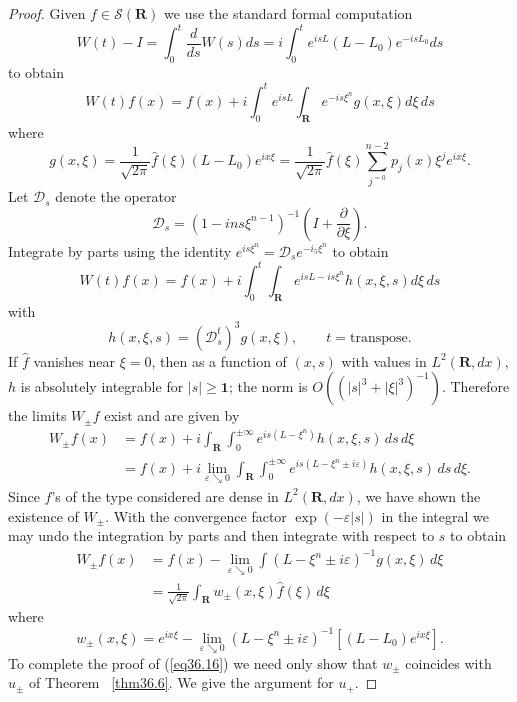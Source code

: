 \documentclass{surv-l}
\theoremstyle{plain}
\theoremstyle{definition}
\numberwithin{equation}{chapter}
\begin{document}
\begin{proof}
Given $f\in \mathscr{S}(\mathbf{R})$ we use the standard formal computation
\begin{equation*}
W(t)-I=\int_{0}^{t}\frac{d}{ds}W(s)ds=i\int_{0}^{t}e^{isL}(L-L_{0})e^{-isL_{0}}ds
\end{equation*}
to obtain
\begin{equation*}
W(t)f(x)=f(x)+i\int_{0}^{t}e^{isL}\int_{\mathbf{R}}e^{-is\xi^{{n}}}g(x, \xi)d\xi\, ds
\end{equation*}
where
\begin{equation*}
g(x,\xi)=\frac{1}{\sqrt{2\pi}}\hat{f}(\xi)(L-L_{0})e^{ix\xi}=\frac{1}{\sqrt{2\pi}}\hat{f}(\xi)\sum_{j^{=0}}^{n-2}p_{j}(x)\xi^{j}e^{ix\xi}.
\end{equation*}
Let $\mathscr{D}_{s}$ denote the operator
\begin{equation*}
\mathscr{D}_{s}=(1-ins\xi^{n-1})^{-1}\left(I+\frac{\partial}{\partial\xi}\right).
\end{equation*}
Integrate by parts using the identity $e^{is\xi^{n}}=\mathscr{D}_{s}e^{-i_{5}\xi^{n}}$ to obtain
\begin{equation*}
W(t)f(x)=f(x)+i\int_{0}^{t}\int_{\mathbf{R}}e^{isL-is\xi^{n}}h(x, \xi, s)d\xi\, ds
\end{equation*}
with
\begin{equation*}
h(x, \xi, s)=(\mathscr{D}_{s}^{t})^{3}g(x, \xi),\qquad t= \mathrm{transpose}.
\end{equation*}
If $\hat{f}$ vanishes near $\xi=0$, then as a function of $(x, s)$ with values in $L^{2} (\mathbf{R}, dx)$, $h$ is absolutely integrable for $|s|\geq \mathbf{1}$; the norm is $O((|s|^{3}+|\xi|^{3})^{-1})$. Therefore the limits $W_{\pm}f$ exist and are given by
\begin{align*}
W_{\pm}f(x)&=f(x)+i\int_{\mathbf{R}}\int_{0}^{\pm\infty}e^{is(L-\xi^{n})}h(x, \xi, s)\, ds\,  d\xi\\
&=f(x)+i\lim_{\varepsilon\searrow 0}\int_{\mathbf{R}}\int_{0}^{\pm\infty}e^{is(L-\xi^{n}\pm i\varepsilon)}h(x, \xi, s)\,ds\, d\xi.
\end{align*}
Since $f$'s of the type considered are dense in $L^{2}(\mathbf{R}, dx)$, we have shown the existence of $ W_{\pm}$. With the convergence factor $\exp(-\varepsilon|s|)$ in the integral we may undo the integration by parts and then integrate with respect to $s$ to obtain
\begin{align*}
W_{\pm}f(x)&=f(x)-\lim_{\varepsilon\searrow 0}\int(L-\xi^{n}\pm i\varepsilon)^{-1}g(x, \xi)\,d\xi\\
&=\frac{1}{\sqrt{2\pi}}\int_{\mathbf{R}}w_{\pm}(x, \xi)\hat{f}(\xi)\,d\xi
\end{align*}
where
\begin{equation}\label{eq36.19}
w_{\pm}(x,\xi)=e^{ix\xi}-\lim_{\varepsilon\searrow 0}(L-\xi^{n}\pm i\varepsilon)^{-1}[(L-L_{0})e^{ix\xi}].
\end{equation}
To complete the proof of (\ref{eq36.16}) we need only show that $w_{\pm}$ coincides with $u_{\pm}$ of Theorem ~\ref{thm36.6}. We give the argument for $u_{+}$.
\end{proof}
\end{document}
